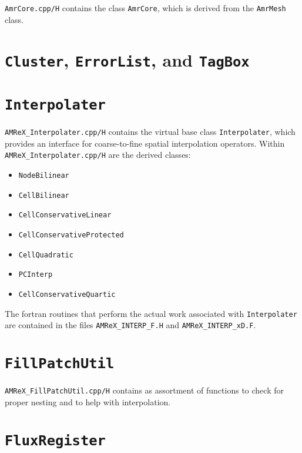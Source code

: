 {\tt AmrCore.cpp/H} contains the class {\tt AmrCore}, which is derived from
the {\tt AmrMesh} class.

\section{{\tt Cluster}, {\tt ErrorList}, and {\tt TagBox}}

\section{{\tt Interpolater}}

{\tt AMReX\_Interpolater.cpp/H} contains the virtual base class {\tt Interpolater}, which provides
an interface for coarse-to-fine spatial interpolation operators.  Within {\tt AMReX\_Interpolater.cpp/H}
are the derived classes:
\begin{itemize}
\item {\tt NodeBilinear}
\item {\tt CellBilinear}
\item {\tt CellConservativeLinear}
\item {\tt CellConservativeProtected}
\item {\tt CellQuadratic}
\item {\tt PCInterp}
\item {\tt CellConservativeQuartic}
\end{itemize}
The fortran routines that perform the actual work associated with {\tt Interpolater} are 
contained in the files {\tt AMReX\_INTERP\_F.H} and {\tt AMReX\_INTERP\_xD.F}.

\section{{\tt FillPatchUtil}}
{\tt AMReX\_FillPatchUtil.cpp/H} contains as assortment of functions to check for proper nesting
and to help with interpolation.

\section{{\tt FluxRegister}}

